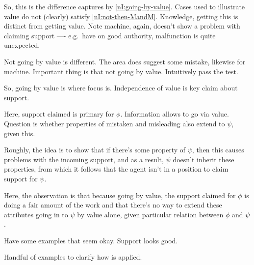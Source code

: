 \begin{note}
  So, this is the difference captures by \ref{nI:going-by-value}.
  Cases used to illustrate value do not (clearly) satisfy \ref{nI:not-then-MandM}.
  Knowledge, getting this is distinct from getting value.
  Note machine, again, doesn't show a problem with claiming support ---- e.g.\ have on good authority, malfunction is quite unexpected.

  Not going by value is different.
  The area does suggest some mistake, likewise for machine.
  Important thing is that not going by value.
  Intuitively pass the \eit{} test.
\end{note}

\begin{note}
  So, going by value is where focus is.
  Independence of value is key claim about support.

  Here, support claimed is primary for \(\phi\).
  Information allows to go via value.
  Question is whether properties of mistaken and misleading also extend to \(\psi\), given this.

  Roughly, the idea is to show that if there's some property of \(\psi\), then this causes problems with the incoming support, and as a result, \(\psi\) doesn't inherit these properties, from which it follows that the agent isn't in a position to claim support for \(\psi\).

  Here, the observation is that because going by value, the support claimed for \(\phi\) is doing a fair amount of the work and that there's no way to extend these attributes going in to \(\psi\) by value alone, given particular relation between \(\phi\) and \(\psi\).
\end{note}

\begin{note}
  Have some examples that seem okay.
  Support looks good.
\end{note}

\begin{note}
  Handful of examples to clarify how \nI{} is applied.
\end{note}

